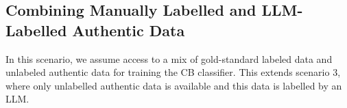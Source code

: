 \subsection{Combining Manually Labelled and LLM-Labelled Authentic Data}

In this scenario, we assume access to a mix of gold-standard labeled data and unlabeled authentic data for training the CB classifier.
This extends scenario 3, where only unlabelled authentic data is available and this data is labelled by an LLM.
